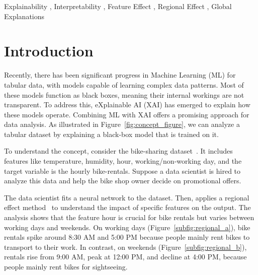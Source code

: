 \documentclass[
twocolumn,
]{ceurart}
\begin{document}
\begin{keywords}
  Explainability \sep
  Interpretability \sep
  Feature Effect \sep
  Regional Effect \sep
  Global Explanations
\end{keywords}

\maketitle


\section{Introduction}
\label{sec:introduction}

Recently, there has been significant progress in Machine Learning (ML) for tabular data, with models capable of learning complex data patterns. Most of these models function as black boxes, meaning their internal workings are not transparent. To address this, eXplainable AI (XAI) has emerged to explain how these models operate. Combining ML with XAI offers a promising approach for data analysis. As illustrated in Figure~\ref{fig:concept_figure}, we can analyze a tabular dataset by explaining a black-box model that is trained on it.

To understand the concept, consider the bike-sharing dataset~\cite{fanaee2014event}. It includes features like temperature, humidity, hour, working/non-working day, and the target variable is the hourly bike-rentals. Suppose a data scientist is hired to analyze this data and help the bike shop owner decide on promotional offers.

The data scientist fits a neural network to the dataset. Then, applies a regional effect method~\cite{herbinger2023decomposing, herbinger_repid_2022} to understand the impact of specific features on the output. The analysis shows that the feature hour is crucial for bike rentals but varies between working days and weekends. On working days (Figure~\ref{subfig:regional_a}), bike rentals spike around 8:30 AM and 5:00 PM because people mainly rent bikes to transport to their work. In contrast, on weekends (Figure~\ref{subfig:regional_b}), rentals rise from 9:00 AM, peak at 12:00 PM, and decline at 4:00 PM, because people mainly rent bikes for sightseeing. 
\end{document}
